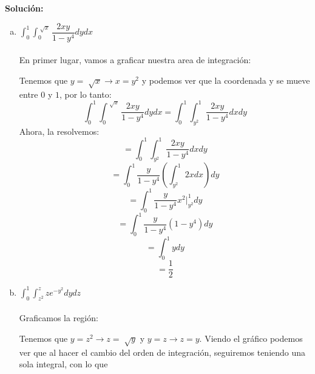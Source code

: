 \documentclass[12pt]{article}
\newenvironment{solucion}
{\begin{mdframed}[backgroundcolor=black!10]
		{\bf Solución:}\\
	}
	{
	\end{mdframed}
}
\newenvironment{preguntas}
{\begin{enumerate}\itemsep12pt
	}
	{
	\end{enumerate}
}
\newcommand{\ev}{\Big|}
\newcommand{\ra}{\rightarrow}
\begin{document}
\begin{preguntas}
\begin{solucion}
\begin{enumerate}[a)]
\item $\displaystyle\int_0^1 \displaystyle\int_0^{\sqrt[]{x}} \dfrac{2xy}{1-y^4} dydx$\\
			\\
			En primer lugar, vamos a graficar nuestra area de integración:
			\begin{center}
			\end{center}
			Tenemos que $y=\sqrt[]{x} \ra x = y^2$ y podemos ver que la coordenada y se mueve entre $0$ y $1$, por lo tanto:
			$$\displaystyle\int_0^1 \displaystyle\int_0^{\sqrt[]{x}} \dfrac{2xy}{1-y^4} dydx
			= \displaystyle\int_0^1 \displaystyle\int_{y^2}^1 \dfrac{2xy}{1-y^4} dxdy$$
			Ahora, la resolvemos:
			$$= \displaystyle\int_0^1 \displaystyle\int_{y^2}^1 \dfrac{2xy}{1-y^4} dxdy$$
			$$= \displaystyle\int_0^1 \dfrac{y}{1-y^4} \left(\displaystyle\int_{y^2}^1 2x dx \right) dy$$
			$$= \displaystyle\int_0^1 \dfrac{y}{1-y^4} x^2 \ev_{y^2}^1 dy$$
			$$= \displaystyle\int_0^1 \dfrac{y}{1-y^4} (1-y^4) dy$$
			$$= \displaystyle\int_0^1 y dy$$
			$$= \dfrac{1}{2}$$
\item $\displaystyle\int_0^1 \displaystyle\int_{z^2}^z ze^{-y^2} dydz$\\
			\\
			Graficamos la región:
			\begin{center}
			\end{center}
			Tenemos que $ y = z^2 \ra z = \sqrt[]{y}$ y $y=z \ra z=y$. Viendo el gráfico podemos ver que al hacer el cambio del orden de integración, seguiremos teniendo una sola integral, con lo que

\end{enumerate}
\end{solucion}
\end{preguntas}
\end{document}
